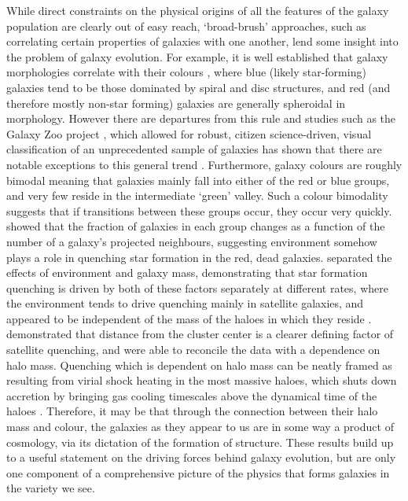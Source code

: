 While direct constraints on the physical origins of all the features of the galaxy population are clearly out of easy reach, `broad-brush' approaches, such as correlating certain properties of galaxies with one another, lend some insight into the problem of galaxy evolution. For example, it is well established that galaxy morphologies correlate with their colours \citep[e.g.][]{2001AJ....122.1861S}, where blue (likely star-forming) galaxies tend to be those dominated by spiral and disc structures, and red (and therefore mostly non-star forming) galaxies are generally spheroidal in morphology. However there are departures from this rule and studies such as the Galaxy Zoo project \citep{2008MNRAS.389.1179L,2011MNRAS.410..166L}, which allowed for robust, citizen science-driven, visual classification of an unprecedented sample of galaxies has shown that there are notable exceptions to this general trend \citep[e.g.][]{2009MNRAS.396..818S,2010MNRAS.405..783M}. Furthermore, galaxy colours are roughly bimodal \citep[e.g.][]{2004ApJ...600..681B,2006MNRAS.373..469B} meaning that galaxies mainly fall into either of the red or blue groups, and very few reside in the intermediate `green' valley. Such a colour bimodality suggests that if transitions between these groups occur, they occur very quickly. \citet{2006MNRAS.373..469B} showed that the fraction of galaxies in each group changes as a function of the number of a galaxy's projected neighbours, suggesting environment somehow plays a role in quenching star formation in the red, dead galaxies. \citet{2010ApJ...721..193P} separated the effects of environment and galaxy mass, demonstrating that star formation quenching is driven by both of these factors separately at different rates, where the environment tends to drive quenching mainly in satellite galaxies, and appeared to be independent of the mass of the haloes in which they reside \citep{2012ApJ...757....4P}. \citet{2013MNRAS.428.3306W} demonstrated that distance from the cluster center is a clearer defining factor of satellite quenching, and were able to reconcile the data with a dependence on halo mass. Quenching which is dependent on halo mass can be neatly framed as resulting from virial shock heating in the most massive haloes, which shuts down accretion by bringing gas cooling timescales above the dynamical time of the haloes \citep[e.g.][]{2006MNRAS.368....2D,2015MNRAS.447..374G}. Therefore, it may be that through the connection between their halo mass and colour, the galaxies as they appear to us are in some way a product of cosmology, via its dictation of the formation of structure. These results build up to a useful statement on the driving forces behind galaxy evolution, but are only one component of a comprehensive picture of the physics that forms galaxies in the variety we see.

